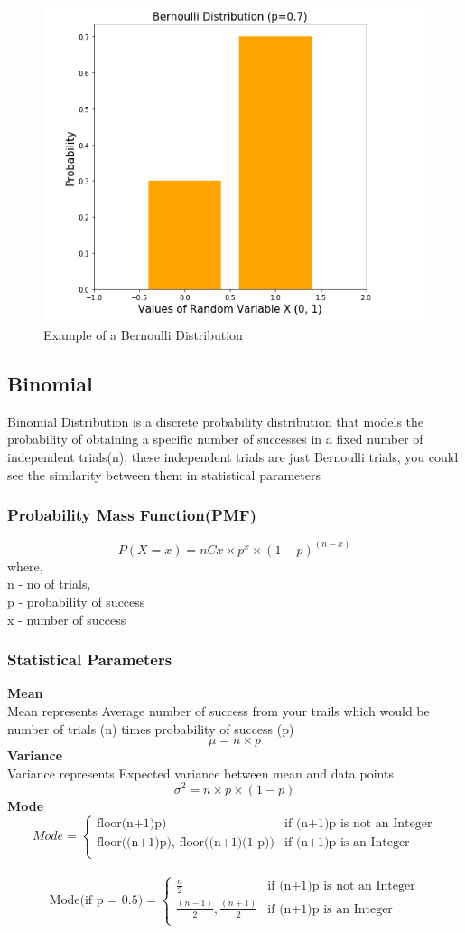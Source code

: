 \documentclass[12pt]{extarticle}
\begin{document}
\begin{figure}[H]
    \centering
    \includegraphics[width=0.5\linewidth]{images/bernoulli_example.png}
    \caption{Example of a Bernoulli Distribution}
    \label{fig:enter-label}
\end{figure}

\subsection{Binomial}
Binomial Distribution is a discrete probability distribution that models the probability of obtaining a specific number of successes
in a fixed number of independent trials(n), these independent trials are just Bernoulli trials, you could see the similarity between
them in statistical parameters

\subsubsection{Probability Mass Function(PMF)}

$$ P(X=x) = nCx \times p^x \times (1-p)^{(n-x)} $$
where,\\
n - no of trials,\\ 
p - probability of success\\
x - number of success\\

\subsubsection{Statistical Parameters}
\textbf{Mean}\\
Mean represents Average number of success from your trails which would be number of trials (n) times probability of success (p)
$$ \mu = n \times p $$
\textbf{Variance}\\
Variance represents Expected variance between mean and data points 
$$ \sigma^2 = n \times p \times (1-p) $$
\textbf{Mode}\\
$$ Mode = 
\begin{cases}
  \text{floor(n+1)p)} & \text{if (n+1)p is not an Integer} \\
  \text{floor((n+1)p), floor((n+1)(1-p))} & \text{if (n+1)p is an Integer} \\
\end{cases}$$ \\
$$ \text{Mode(if p = 0.5)} = 
\begin{cases}
  \frac{n}{2} & \text{if (n+1)p is not an Integer} \\
  \frac{(n-1)}{2},\frac{(n+1)}{2} & \text{if (n+1)p is an Integer} \\
\end{cases}
$$
\end{document}
